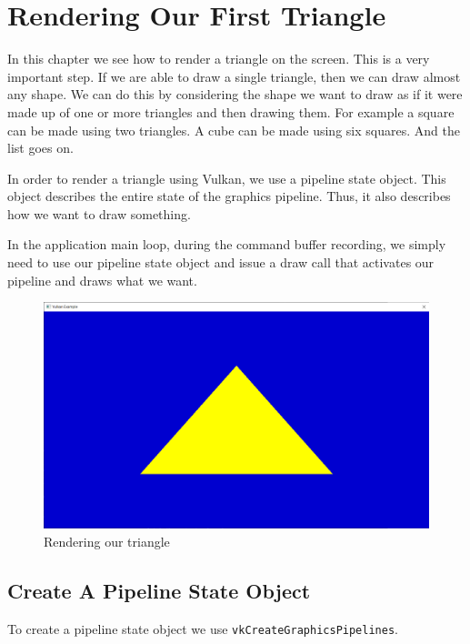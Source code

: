 \chapter{Rendering Our First Triangle}
\label{chap:Triangle}

In this chapter we see how to render a triangle on the screen.
This is a very important step.
If we are able to draw a single triangle, then we can draw almost any shape.
We can do this by considering the shape we want to draw as if it were
made up of one or more triangles and then drawing them.
For example a square can be made using two triangles.
A cube can be made using six squares.
And the list goes on.

In order to render a triangle using Vulkan, we use a pipeline state object.
This object describes the entire state of the graphics pipeline.
Thus, it also describes how we want to draw something.

In the application main loop, during the command buffer recording, we
simply need to use our pipeline state object and issue a draw call that activates
our pipeline and draws what we want.

\begin{figure}[ht]
    \centering
    \includegraphics[scale=0.20]{images/ChTriangle/Triangle.png}
    \caption{Rendering our triangle}
    \label{fig::RenderTriangle}
\end{figure}

\section{Create A Pipeline State Object}

To create a pipeline state object we use \texttt{vkCreateGraphicsPipelines}.

\begin{minipage}{\linewidth}{\noindent}
    
\end{minipage}

